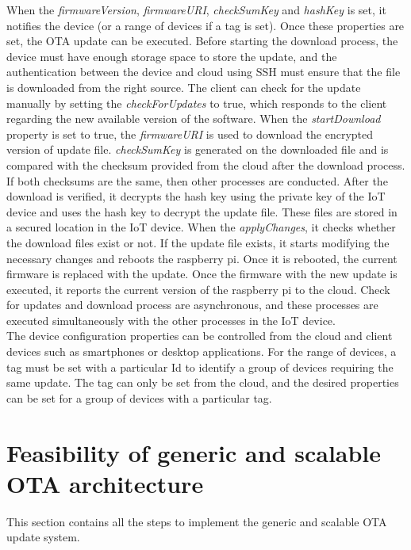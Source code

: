 \documentclass[12pt,a4paper]{article}
\begin{document}
{When the \textit{firmwareVersion}, \textit{firmwareURI}, \textit{checkSumKey} and \textit{hashKey} is set, it notifies the device (or a range of devices if a tag is set). Once these properties are set, the OTA update can be executed. Before starting the download process, the device must have enough storage space to store the update, and the authentication between the device and cloud using SSH must ensure that the file is downloaded from the right source. The client can check for the update manually by setting the \textit{checkForUpdates} to true, which responds to the client regarding the new available version of the software. When the \textit{startDownload} property is set to true, the \textit{firmwareURI} is used to download the encrypted version of update file. \textit{checkSumKey} is generated on the downloaded file and is compared with the checksum provided from the cloud after the download process. If both checksums are the same, then other processes are conducted. After the download is verified, it decrypts the hash key using the private key of the IoT device and uses the hash key to decrypt the update file. These files are stored in a secured location in the IoT device. When the \textit{applyChanges}, it checks whether the download files exist or not. If the update file exists, it starts modifying the necessary changes and reboots the raspberry pi. Once it is rebooted, the current firmware is replaced with the update. Once the firmware with the new update is executed, it reports the current version of the raspberry pi to the cloud. Check for updates and download process are asynchronous, and these processes are executed simultaneously with the other processes in the IoT device. \\

The device configuration properties can be controlled from the cloud and client devices such as smartphones or desktop applications. For the range of devices, a tag must be set with a particular Id to identify a group of devices requiring the same update. The tag can only be set from the cloud, and the desired properties can be set for a group of devices with a particular tag.

\newpage

\renewcommand{\baselinestretch}{1.5} %
\section{Feasibility of generic and scalable OTA architecture}

This section contains all the steps to implement the generic and scalable OTA update system.

}
\end{document}
